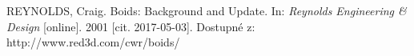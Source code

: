\begin{thebibliography}{99}
REYNOLDS, Craig. Boids: Background and Update. In: \textit{Reynolds Engineering \& Design} [online]. 2001 [cit. 2017-05-03]. Dostupné z: http://www.red3d.com/cwr/boids/

\end{thebibliography}